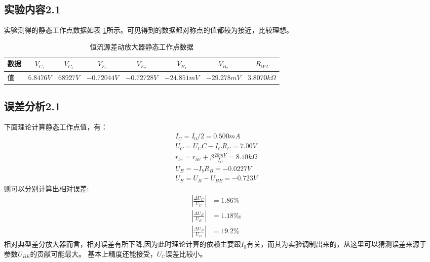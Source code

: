 \documentclass[a4paper,11pt,UTF8]{ctexart}
\begin{document}
	\subsection{实验内容2.1}
	实验测得的静态工作点数据如表 \ref{tab:sSTab}所示。可见得到的数据都对称点的值都较为接近，比较理想。
	\begin{table}[!h!tbp]
		\caption{恒流源差动放大器静态工作点数据}\label{tab:sSTab}
		\centering
		\begin{tabular}{|l|c|c|c|c|c|c|c|}
			\hline
			数据 &$V_{C_1}$&$V_{C_2}$&$V_{E_1}$&$V_{E_2}$&$V_{B_1}$&$V_{B_2}$&$R_{W2}$         \\ \hline
			值   &$6.8476V$&$68927V$&$-0.72044V$&$-0.72728V$&$-24.851mV$&$-29.278mV$&$3.8070k\Omega$     \\ \hline
		\end{tabular}
	\end{table}
	\subsection{误差分析2.1}
	下面理论计算静态工作点值，有：
	\begin{equation}
		\begin{aligned}
			I_C=I_0/2=0.500 mA\\
			U_C=U_CC-I_CR_C=7.00V\\
			r_{be}=r_{bb'}+\beta\frac{26mV}{I_C}=8.10k\Omega\\
			U_{B}=-I_bR_B=-0.0227V\\
			U_{E}=U_{B}-U_{BE}=-0.723V
		\end{aligned}
	\end{equation}
	则可以分别计算出相对误差:
	\begin{equation}
		\begin{aligned}
			\left |\frac{\Delta U_C}{U_C}\right |&=1.86\%\\
			\left |\frac{\Delta U_E}{U_E}\right |&=1.18‰\\
			\left |\frac{\Delta U_B}{U_B}\right |&=19.2\%
		\end{aligned}
	\end{equation}
	相对典型差分放大器而言，相对误差有所下降,因为此时理论计算的依赖主要跟$I_0$有关，而其为实验调制出来的，从这里可以猜测误差来源于参数$U_{BE}$的贡献可能最大。
	基本上精度还能接受，$U_C$误差比较小。
\end{document}
